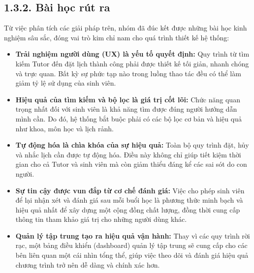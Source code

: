 
\subsection*{1.3.2. Bài học rút ra}
Từ việc phân tích các giải pháp trên, nhóm đã đúc kết được những bài học kinh nghiệm sâu sắc, đóng vai trò kim chỉ nam cho quá trình thiết kế hệ thống:
\begin{itemize}
    \item \textbf{Trải nghiệm người dùng (UX) là yếu tố quyết định:} Quy trình từ tìm kiếm Tutor đến đặt lịch thành công phải được thiết kế tối giản, nhanh chóng và trực quan. Bất kỳ sự phức tạp nào trong luồng thao tác đều có thể làm giảm tỷ lệ sử dụng của sinh viên.
    \item \textbf{Hiệu quả của tìm kiếm và bộ lọc là giá trị cốt lõi:}  Chức năng quan trọng nhất đối với sinh viên là khả năng tìm được đúng người hướng dẫn mình cần. Do đó, hệ thống bắt buộc phải có các bộ lọc cơ bản và hiệu quả như khoa, môn học và lịch rảnh.

    \item \textbf{Tự động hóa là chìa khóa của sự hiệu quả:}  Toàn bộ quy trình đặt, hủy và nhắc lịch cần được tự động hóa. Điều này không chỉ giúp tiết kiệm thời gian cho cả Tutor và sinh viên mà còn giảm thiểu đáng kể các sai sót do con người.

    \item \textbf{Sự tin cậy được vun đắp từ cơ chế đánh giá:}  Việc cho phép sinh viên để lại nhận xét và đánh giá sau mỗi buổi học là phương thức minh bạch và hiệu quả nhất để xây dựng một cộng đồng chất lượng, đồng thời cung cấp thông tin tham khảo giá trị cho những người dùng khác.

    \item \textbf{Quản lý tập trung tạo ra hiệu quả vận hành:}  Thay vì các quy trình rời rạc, một bảng điều khiển (dashboard) quản lý tập trung sẽ cung cấp cho các bên liên quan một cái nhìn tổng thể, giúp việc theo dõi và đánh giá hiệu quả chương trình trở nên dễ dàng và chính xác hơn.

\end{itemize}


